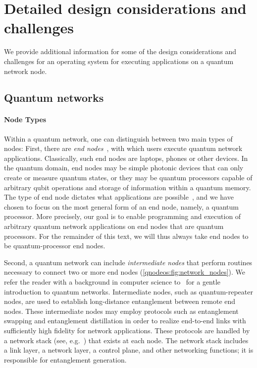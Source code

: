 \section{Detailed design considerations and challenges}
\label{qnodeos:sec:design-consid:challenges}

We provide additional information for some of the design considerations and challenges for an operating system for executing applications on a quantum network node.

\subsection{Quantum networks}
\label{qnodeos:sec:quantum-networks}

\paragraph{Node Types}

Within a quantum network, one can distinguish between two main types of nodes: First, there are \emph{end nodes}~\cite{wehner_2018_stages}, with which users execute quantum network applications. Classically, such end nodes are laptops, phones or other devices. In the quantum domain, end nodes may be simple photonic devices that can only create or measure quantum states, or they may be quantum processors capable of arbitrary qubit operations and storage of information within a quantum memory. The type of end node dictates what applications are possible~\cite{wehner_2018_stages}, and we have chosen to focus on the most general form of an end node, namely, a quantum processor. More precisely, our goal is to enable programming and execution of arbitrary quantum network applications on end nodes that are quantum processors. For the remainder of this text, we will thus always take end nodes to be quantum-processor end nodes.

Second, a quantum network can include \emph{intermediate nodes} that perform routines necessary to connect two or more end nodes (\cref{qnodeos:fig:network_nodes}).
We refer the reader with a background in computer science to~\cite{vanMeter_book} for a gentle introduction to quantum networks. 
Intermediate nodes, such as quantum-repeater nodes, are used to establish long-distance entanglement between remote end nodes. These intermediate nodes may employ protocols such as entanglement swapping and entanglement distillation in order to realize end-to-end links with sufficiently high fidelity for network applications. These protocols are handled by a network stack (see, e.g.~\cite{dahlberg_2019_egp}) that exists at each node. The network stack includes a link layer, a network layer, a control plane, and other networking functions; it is responsible for entanglement generation.

